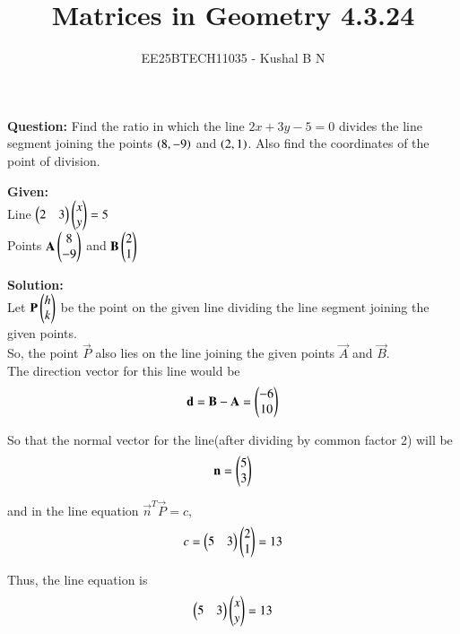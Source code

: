 \documentclass[journal,12pt,onecolumn]{IEEEtran}
\title{Matrices in Geometry 4.3.24}
\author{EE25BTECH11035 - Kushal B N}
\theoremstyle{remark}
\begin{document}
\vspace{3cm}
\maketitle
{\let\newpage\relax\maketitle}
\textbf{Question: }
Find the ratio in which the line $2x + 3y - 5 = 0$ divides the line segment joining the points $\left(8,-9\right)$ and $\left(2,1\right)$. Also find the coordinates of the point of division.
\bigskip

\textbf{Given: } \\
Line $\begin{pmatrix}2 & 3\end{pmatrix}\begin{pmatrix}x\\y\end{pmatrix} = 5$\\
Points $\mathbf{A}\begin{pmatrix}8\\-9\end{pmatrix}$ and $\mathbf{B}\begin{pmatrix}2\\1\end{pmatrix}$
\bigskip

\textbf{Solution: }\\
Let $\mathbf{P}\begin{pmatrix}h\\k\end{pmatrix}$ be the point on the given line dividing the line segment joining the given points. \\
So, the point $\vec{P}$ also lies on the line joining the given points $\vec{A}$ and $\vec{B}$.\\
The direction vector for this line would be\\
\begin{equation}
    \mathbf{d} = \mathbf{B} - \mathbf{A} = \begin{pmatrix}-6\\10\end{pmatrix}
\end{equation}

So that the normal vector for the line(after dividing by common factor 2) will be\\
\begin{equation}
    \mathbf{n} = \begin{pmatrix}5\\3\end{pmatrix}
\end{equation}

and in the line equation $\vec{n}^T\vec{P}=c$,\\
\begin{equation}
    c = \begin{pmatrix}5&3\end{pmatrix}\begin{pmatrix}2\\1\end{pmatrix} = 13
\end{equation}

Thus, the line equation is\\
\begin{equation}
    \begin{pmatrix}5&3\end{pmatrix}\begin{pmatrix}x\\y\end{pmatrix} = 13
\end{equation}
\end{document}
